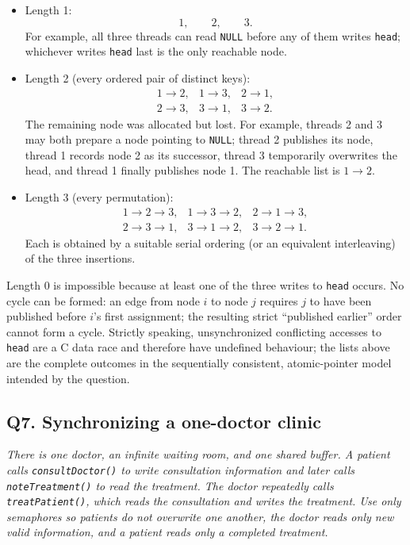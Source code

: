 \begin{itemize}
\item Length 1:
\[
1,\qquad 2,\qquad 3.
\]
For example, all three threads can read \texttt{NULL} before any of them
writes \texttt{head}; whichever writes \texttt{head} last is the only
reachable node.

\item Length 2 (every ordered pair of distinct keys):
\[
\begin{array}{lll}
1\mathbin{\to}2,&1\mathbin{\to}3,&
2\mathbin{\to}1,\\
2\mathbin{\to}3,&3\mathbin{\to}1,&
3\mathbin{\to}2.
\end{array}
\]
The remaining node was allocated but lost.  For example, threads 2 and 3
may both prepare a node pointing to \texttt{NULL}; thread 2 publishes its
node, thread 1 records node 2 as its successor, thread 3 temporarily
overwrites the head, and thread 1 finally publishes node 1.  The reachable
list is \(1\to2\).

\item Length 3 (every permutation):
\[
\begin{array}{lll}
1\mathbin{\to}2\mathbin{\to}3,&
1\mathbin{\to}3\mathbin{\to}2,&
2\mathbin{\to}1\mathbin{\to}3,\\
2\mathbin{\to}3\mathbin{\to}1,&
3\mathbin{\to}1\mathbin{\to}2,&
3\mathbin{\to}2\mathbin{\to}1.
\end{array}
\]
Each is obtained by a suitable serial ordering (or an equivalent
interleaving) of the three insertions.
\end{itemize}

Length 0 is impossible because at least one of the three writes to
\texttt{head} occurs.  No cycle can be formed: an edge from node \(i\) to
node \(j\) requires \(j\) to have been published before \(i\)'s first
assignment; the resulting strict ``published earlier'' order cannot form a
cycle.  Strictly speaking, unsynchronized conflicting accesses to
\texttt{head} are a C data race and therefore have undefined behaviour;
the lists above are the complete outcomes in the sequentially consistent,
atomic-pointer model intended by the question.

\subsection*{Q7. Synchronizing a one-doctor clinic}

\emph{There is one doctor, an infinite waiting room, and one shared buffer.
A patient calls \texttt{consultDoctor()} to write consultation information
and later calls \texttt{noteTreatment()} to read the treatment.  The doctor
repeatedly calls \texttt{treatPatient()}, which reads the consultation and
writes the treatment.  Use only semaphores so patients do not overwrite one
another, the doctor reads only new valid information, and a patient reads
only a completed treatment.}

